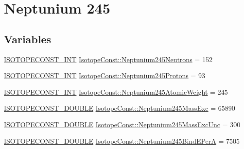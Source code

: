 \hypertarget{group___isotope_const-_neptunium-_np245}{}\section{Neptunium 245}
\label{group___isotope_const-_neptunium-_np245}
\subsection*{Variables}
\begin{DoxyCompactItemize}
\item 
\mbox{\hyperlink{group___isotope_const-_macros_ga5f18360b3e99483a35c32d789e62621c}{I\+S\+O\+T\+O\+P\+E\+C\+O\+N\+S\+T\+\_\+\+I\+NT}} \mbox{\hyperlink{group___isotope_const-_neptunium-_np245_ga11b905e76484dded133e0172fc799dd5}{Isotope\+Const\+::\+Neptunium245\+Neutrons}} = 152
\item 
\mbox{\hyperlink{group___isotope_const-_macros_ga5f18360b3e99483a35c32d789e62621c}{I\+S\+O\+T\+O\+P\+E\+C\+O\+N\+S\+T\+\_\+\+I\+NT}} \mbox{\hyperlink{group___isotope_const-_neptunium-_np245_ga6cccb36bc42cba1a4788307b09d144d1}{Isotope\+Const\+::\+Neptunium245\+Protons}} = 93
\item 
\mbox{\hyperlink{group___isotope_const-_macros_ga5f18360b3e99483a35c32d789e62621c}{I\+S\+O\+T\+O\+P\+E\+C\+O\+N\+S\+T\+\_\+\+I\+NT}} \mbox{\hyperlink{group___isotope_const-_neptunium-_np245_gaf84979c91de6dbdd6d27693ec181117b}{Isotope\+Const\+::\+Neptunium245\+Atomic\+Weight}} = 245
\item 
\mbox{\hyperlink{group___isotope_const-_macros_ga8f45a7272ce02c0b4c65c44636ed719a}{I\+S\+O\+T\+O\+P\+E\+C\+O\+N\+S\+T\+\_\+\+D\+O\+U\+B\+LE}} \mbox{\hyperlink{group___isotope_const-_neptunium-_np245_ga073e2e692ec0581de702a84b9db8c7c9}{Isotope\+Const\+::\+Neptunium245\+Mass\+Exc}} = 65890
\item 
\mbox{\hyperlink{group___isotope_const-_macros_ga8f45a7272ce02c0b4c65c44636ed719a}{I\+S\+O\+T\+O\+P\+E\+C\+O\+N\+S\+T\+\_\+\+D\+O\+U\+B\+LE}} \mbox{\hyperlink{group___isotope_const-_neptunium-_np245_ga1282462d681c12195cbee808d567ae50}{Isotope\+Const\+::\+Neptunium245\+Mass\+Exc\+Unc}} = 300
\item 
\mbox{\hyperlink{group___isotope_const-_macros_ga8f45a7272ce02c0b4c65c44636ed719a}{I\+S\+O\+T\+O\+P\+E\+C\+O\+N\+S\+T\+\_\+\+D\+O\+U\+B\+LE}} \mbox{\hyperlink{group___isotope_const-_neptunium-_np245_gaf62d056f4db1661844f5416d3cd0b869}{Isotope\+Const\+::\+Neptunium245\+Bind\+E\+PerA}} = 7505
\item 

\end{DoxyCompactItemize}
